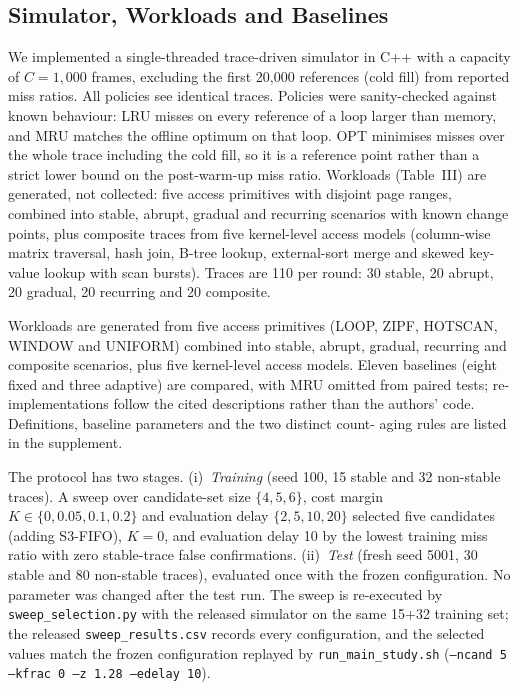 \documentclass[10pt,twocolumn,a4paper]{IEEEtran}
\begin{document}
\subsection{Simulator, Workloads and Baselines}

We implemented a single-threaded trace-driven simulator in C++ with a capacity
of $C = 1{,}000$ frames, excluding the first 20,000 references (cold fill)
from reported miss ratios. All policies see identical traces. Policies were
sanity-checked against known behaviour: LRU misses on every reference of a
loop larger than memory, and MRU matches the offline optimum on that loop. OPT
minimises misses over the whole trace including the cold fill, so it is a
reference point rather than a strict lower bound on the post-warm-up miss
ratio. Workloads (Table~III) are generated, not
collected: five access primitives with disjoint page ranges, combined into
stable, abrupt, gradual and recurring scenarios with known change points, plus
composite traces from five kernel-level access models (column-wise matrix
traversal, hash join, B-tree lookup, external-sort merge and skewed key-value
lookup with scan bursts). Traces are 110 per round: 30 stable, 20 abrupt,
20 gradual, 20 recurring and 20 composite.

Workloads are generated from five access primitives (LOOP, ZIPF, HOTSCAN,
WINDOW and UNIFORM) combined into stable, abrupt, gradual, recurring and
composite scenarios, plus five kernel-level access models. Eleven baselines
(eight fixed and three adaptive) are compared, with MRU omitted from paired
tests; re-implementations follow the cited descriptions rather than the
authors' code. Definitions, baseline parameters and the two distinct count-
aging rules are listed in the supplement.

The protocol has two stages. (i)~\emph{Training} (seed 100, 15 stable and 32
non-stable traces). A sweep over candidate-set size $\{4,5,6\}$, cost margin
$K \in \{0, 0.05, 0.1, 0.2\}$ and evaluation delay $\{2,5,10,20\}$ selected
five candidates (adding S3-FIFO), $K = 0$, and evaluation delay 10 by the lowest
training miss ratio with zero stable-trace false confirmations. (ii)~\emph{Test}
(fresh seed 5001, 30 stable and 80 non-stable traces), evaluated once with the
frozen configuration. No parameter was changed after the test run. The sweep is
re-executed by \texttt{sweep\_selection.py} with the released simulator on the
same 15+32 training set; the released \texttt{sweep\_results.csv} records every
configuration, and the selected values match the frozen configuration replayed
by \texttt{run\_main\_study.sh}
(\texttt{--ncand 5 --kfrac 0 --z 1.28 --edelay 10}).
\end{document}
